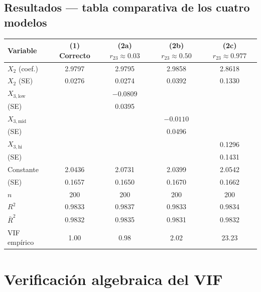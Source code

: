 \documentclass[12pt, letterpaper]{article}
\begin{document}
\subsection{Resultados --- tabla comparativa de los cuatro modelos}

\begin{center}
\renewcommand{\arraystretch}{1.3}
\small
\begin{tabular}{lcccc}
\toprule
\textbf{Variable}
  & \textbf{(1) Correcto}
  & \textbf{(2a) $r_{23} \approx 0.03$}
  & \textbf{(2b) $r_{23} \approx 0.50$}
  & \textbf{(2c) $r_{23} \approx 0.977$} \\
\midrule
$X_2$ (coef.)       & 2.9797  & 2.9795  & 2.9858  & 2.8618  \\
$X_2$ (SE)          & 0.0276  & 0.0274  & 0.0392  & 0.1330  \\
\midrule
$X_{3,\text{low}}$  &         & $-0.0809$ &       &         \\
(SE)                &         & 0.0395    &       &         \\
$X_{3,\text{mid}}$  &         &           & $-0.0110$ &     \\
(SE)                &         &           & 0.0496    &     \\
$X_{3,\text{hi}}$   &         &           &       & 0.1296  \\
(SE)                &         &           &       & 0.1431  \\
\midrule
Constante           & 2.0436  & 2.0731  & 2.0399  & 2.0542  \\
(SE)                & 0.1657  & 0.1650  & 0.1670  & 0.1662  \\
\midrule
$n$                 & 200     & 200     & 200     & 200     \\
$R^2$               & 0.9833  & 0.9837  & 0.9833  & 0.9834  \\
$\bar{R}^2$         & 0.9832  & 0.9835  & 0.9831  & 0.9832  \\
VIF empírico        & 1.00    & 0.98    & 2.02    & 23.23   \\
\bottomrule
\end{tabular}
\end{center}

\section{Verificación algebraica del VIF}
\end{document}
